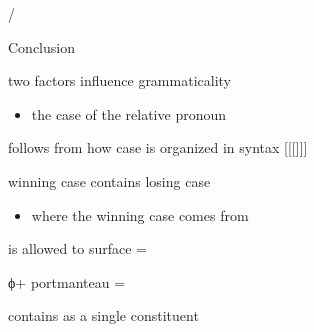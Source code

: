 \documentclass[xcolor=dvipsnames,10pt]{beamer}
\begin{document}
\begin{frame}[t]{/}
\begin{multicols}{2}
\end{multicols}

\end{frame}


\begin{frame}[t]{Conclusion}

\pause

two factors influence grammaticality

\pause

\begin{itemize}
  \item {the case of the relative pronoun}
\end{itemize}

\pause

  \center
  follows from how case is organized in syntax [[[]]]

  winning case contains losing case

\vspace{1em}

\pause

\begin{itemize}
  \item {where the winning case comes from}
\end{itemize}

\pause

  \center
   is allowed to surface =

  ϕ+ portmanteau =

   contains  as a single constituent

\end{frame}
\end{document}
